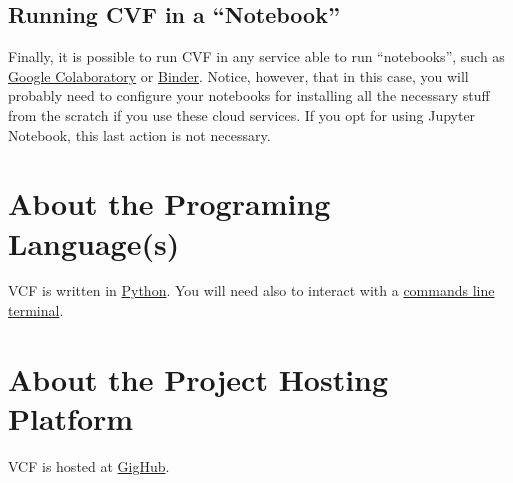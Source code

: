 \subsection{Running CVF in a ``Notebook''}
Finally, it is possible to run CVF in any service able to run
``notebooks'', such
as \href{https://colab.research.google.com/}{Google Colaboratory}
or \href{https://mybinder.org/}{Binder}. Notice, however, that in this
case, you will probably need to configure your notebooks for
installing all the necessary stuff from the scratch if you use these
cloud services. If you opt for using Jupyter Notebook, this last
action is not necessary.

\section{About the Programing Language(s)}

VCF is written in \href{https://mybinder.org/}{Python}. You will need
also to interact with
a \href{https://en.wikipedia.org/wiki/Command-line_interface}{commands
line terminal}.

\section{About the Project Hosting Platform}

VCF is hosted at \href{https://github.com/}{GigHub}.
